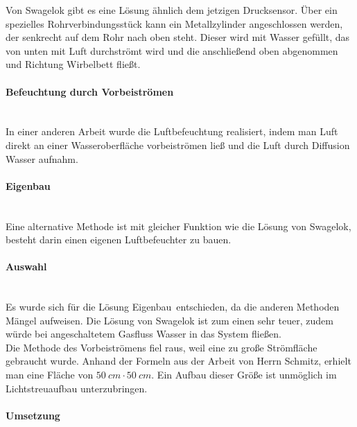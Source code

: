 Von Swagelok gibt es eine Lösung ähnlich dem jetzigen Drucksensor. Über ein spezielles Rohrverbindungsstück kann ein Metallzylinder angeschlossen werden, der senkrecht auf dem Rohr nach oben steht. Dieser wird mit Wasser gefüllt, das von unten mit Luft durchströmt wird und die anschließend oben abgenommen und Richtung Wirbelbett fließt.

\paragraph{Befeuchtung durch Vorbeiströmen}

\hfill \\

In einer anderen Arbeit \cite{Fallturmexperiment} wurde die Luftbefeuchtung realisiert, indem man Luft direkt an einer  Wasseroberfläche vorbeiströmen ließ und die Luft durch Diffusion Wasser aufnahm. 

\paragraph{Eigenbau}
\hfill \\

Eine alternative Methode ist mit gleicher Funktion wie die Lösung von Swagelok, besteht darin einen eigenen Luftbefeuchter zu bauen. 


\paragraph{Auswahl}

\hfill \\

Es wurde sich für die Lösung \glqq Eigenbau\grqq \ entschieden, da die anderen Methoden Mängel aufweisen. Die Lösung von Swagelok ist zum einen sehr teuer, zudem würde bei angeschaltetem Gasfluss Wasser in das System fließen. \\
Die Methode des Vorbeiströmens fiel raus, weil eine zu große Strömfläche gebraucht wurde. Anhand der Formeln aus der Arbeit von Herrn Schmitz, erhielt man eine Fläche von $\SI{50}{cm} \cdot \SI{50}{cm}$. Ein Aufbau dieser Größe ist unmöglich im Lichtstreuaufbau unterzubringen.

\paragraph{Umsetzung}

\hfill \\

